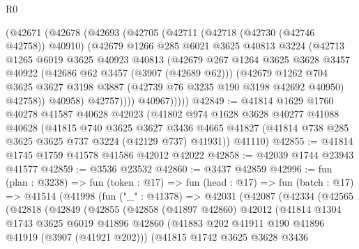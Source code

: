 \begin{lexlean}{R0}
\begin{coremodule}
          (@42671
            (@42678
              (@42693
                (@42705
                  (@42711
                    (@42718 (@42730 (@42746 @42758)) @40910)
                    (@42679
                      @1266
                      @285
                      @6021
                      @3625
                      @40813
                      @3224
                      (@42713
                        @1265
                        @6019
                        @3625
                        @40923
                        @40813
                        (@42679
                          @267
                          @1264
                          @3625
                          @3628
                          @3457
                          @40922
                          (@42686 @62 @3457 (@3907 (@42689 @62)))
                          (@42679
                            @1262
                            @704
                            @3625
                            @3627
                            @3198
                            @3887
                            (@42739 @76 @3235 @190 @3198 @42692 @40950)
                            @42758))
                        @40958)
                      @42757))))
              @40967)))))
@42849 := @41814
    @1629
    @1760
    @40278
    @41587
    @40628
    @42023
    (@41802
      @974
      @1628
      @3628
      @40277
      @41088
      @40628
      (@41815
        @740
        @3625
        @3627
        @3436
        @4665
        @41827
        (@41814 @738 @285 @3625 @3625 @737 @3224 (@42129 @737) @41931))
      @41110)
@42855 := @41814 @1745 @1759 @41578 @41586 @42012 @42022
@42858 := @42039 @1744 @23943 @41577
@42859 := @3536 @23532
@42860 := @3437 @42859
@42996 := fun (plan : @3238) =>
  fun (token : @17) =>
  fun (head : @17) =>
  fun (batch : @17) =>
  @41514
    (@41998
      (fun ("_" : @41378) =>
      @42031
        (@42087
          (@42334
            (@42565
              (@42818
                (@42849
                  (@42855
                    (@42858
                      (@41897 @42860)
                      @42012
                      (@41814
                        @1304
                        @1743
                        @3625
                        @6019
                        @41896
                        @42860
                        (@41883 @202 @41911 @190 @41896 @41919 (@3907 (@41921 @202)))
                        (@41815
                          @1742
                          @3625
                          @3628
                          @3436

\end{coremodule}
\end{lexlean}
